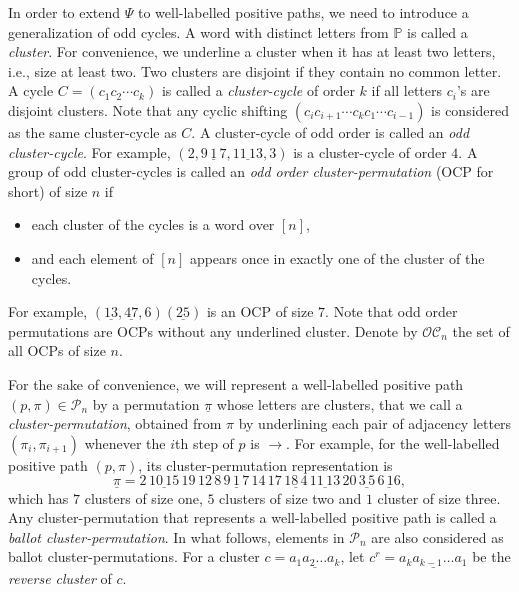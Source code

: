 \documentclass[12pt]{amsart}
\numberwithin{equation}{section}
\theoremstyle{plain}
\theoremstyle{definition}
\newcommand{\Po}{\mathbb{P}}
\newcommand{\PP}{\mathcal{P}}
\newcommand{\C}{\mathcal{OC}}
\begin{document}
In order to extend $\Psi$ to well-labelled positive paths, we need to introduce a generalization of odd cycles. A word with distinct letters from $\Po$ is called a {\em cluster}. For convenience, we underline a cluster when it has at least two letters, i.e., size at least two. 
Two clusters are disjoint if they contain no common letter.  
A cycle $C=(c_1c_2\cdots c_k)$ is called a {\em  cluster-cycle} of order $k$ if all letters $c_i$'s are disjoint clusters.  Note that any cyclic shifting $(c_ic_{i+1}\cdots c_kc_1\cdots c_{i-1})$ is considered as the same cluster-cycle as $C$. A cluster-cycle of odd order is called an {\em odd cluster-cycle}. For example, $(2,\underline{9\,1\,7},\underline{11\,13},3)$ is a cluster-cycle of order $4$. 
A group of odd cluster-cycles   is called an {\em odd order cluster-permutation} (OCP for short) of size  $n$ if
\begin{itemize} 
\item each cluster of the cycles is a word over $[n]$,
\item and each element of $[n]$ appears once in exactly  one of the cluster of the cycles. 
\end{itemize}
For example, $(\underline{13},\underline{47},6)(\underline{25})$ is an OCP of size $7$. Note that odd order permutations are OCPs without any underlined cluster. Denote by $\C_n$ the set of all OCPs of size $n$. 

For the sake of convenience, we will represent a well-labelled positive path $(p,\pi)\in\PP_n$ by a permutation $\underline{\pi}$ whose letters are clusters, that we call a {\em cluster-permutation}, obtained from $\pi$ by underlining   each pair of adjacency letters $(\pi_i,\pi_{i+1})$ whenever the $i$th step of $p$ is $\rightarrow$. For example, for the well-labelled positive path $(p,\pi)$, its cluster-permutation representation is 
$$
\underline{\pi}=2\,\underline{10\,15}\,19\,12\,8\,\underline{9\,1\,7}\,14\,17\,\underline{18\,4}\,\underline{11\,13}\,20\,\underline{3\,5}\,\underline{6\,16},
$$
 which has $7$ clusters of size one, $5$ clusters of size two and $1$ cluster of size three. Any cluster-permutation that represents a well-labelled positive path is called a {\em ballot cluster-permutation}. In what follows, elements in $\PP_n$ are also considered as ballot cluster-permutations. For a cluster $c=\underline{a_1a_2\ldots a_k}$, let $c^r=\underline{a_ka_{k-1}\ldots a_1}$ be the {\em reverse cluster} of $c$. 
 
\end{document}
